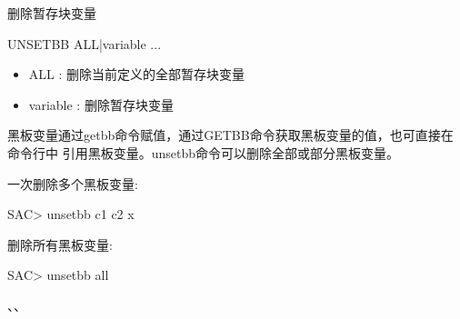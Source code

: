\label{cmd:unsetbb}

删除暂存块变量

\begin{SACSTX}
UNSETBB ALL|variable ...
\end{SACSTX}

\begin{itemize}
\item ALL : 删除当前定义的全部暂存块变量 
\item variable : 删除暂存块变量 
\end{itemize}

黑板变量通过getbb命令赋值，通过GETBB命令获取黑板变量的值，也可直接在命令行中
引用黑板变量。unsetbb命令可以删除全部或部分黑板变量。

一次删除多个黑板变量:
\begin{SACCode}
SAC> unsetbb c1 c2 x
\end{SACCode}

删除所有黑板变量:
\begin{SACCode}
SAC> unsetbb all
\end{SACCode}

、、
